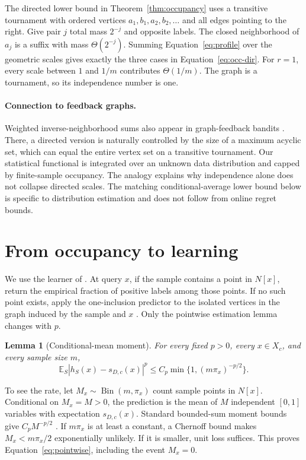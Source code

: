 \documentclass{article}
\newtheorem{lemma}[theorem]{Lemma}
\theoremstyle{definition}
\theoremstyle{remark}
\newcommand{\E}{\mathbb E}
\begin{document}
The directed lower bound in Theorem~\ref{thm:occupancy} uses a transitive tournament with ordered vertices $a_1,b_1,a_2,b_2,\ldots$ and all edges pointing to the right. Give pair $j$ total mass $2^{-j}$ and opposite labels. The closed neighborhood of $a_j$ is a suffix with mass $\Theta(2^{-j})$. Summing Equation~\eqref{eq:profile} over the geometric scales gives exactly the three cases in Equation~\eqref{eq:occ-dir}. For $r=1$, every scale between $1$ and $1/m$ contributes $\Theta(1/m)$. The graph is a tournament, so its independence number is one.

\paragraph{Connection to feedback graphs.} Weighted inverse-neighborhood sums also appear in graph-feedback bandits \citep{alon2017nonstochastic,alon2015beyond}. There, a directed version is naturally controlled by the size of a maximum acyclic set, which can equal the entire vertex set on a transitive tournament. Our statistical functional is integrated over an unknown data distribution and capped by finite-sample occupancy. The analogy explains why independence alone does not collapse directed scales. The matching conditional-average lower bound below is specific to distribution estimation and does not follow from online regret bounds.

\section{From occupancy to learning}
\label{sec:upper}

We use the learner of \citet{bressan2026conditional}. At query $x$, if the sample contains a point in $N[x]$, return the empirical fraction of positive labels among those points. If no such point exists, apply the one-inclusion predictor to the isolated vertices in the graph induced by the sample and $x$ \citep{haussler1994sphere}. Only the pointwise estimation lemma changes with $p$.

\begin{lemma}[Conditional-mean moment]
\label{lem:pointwise}
For every fixed $p>0$, every $x\in X_c$, and every sample size $m$,
\begin{equation}
\E_S|h_S(x)-s_{D,c}(x)|^p
\leq C_p\min\{1,(m\pi_x)^{-p/2}\}. \label{eq:pointwise}
\end{equation}
\end{lemma}

To see the rate, let $M_x\sim\operatorname{Bin}(m,\pi_x)$ count sample points in $N[x]$. Conditional on $M_x=M>0$, the prediction is the mean of $M$ independent $[0,1]$ variables with expectation $s_{D,c}(x)$. Standard bounded-sum moment bounds give $C_pM^{-p/2}$ \citep{boucheron2013concentration}. If $m\pi_x$ is at least a constant, a Chernoff bound makes $M_x<m\pi_x/2$ exponentially unlikely. If it is smaller, unit loss suffices. This proves Equation~\eqref{eq:pointwise}, including the event $M_x=0$.
\end{document}

